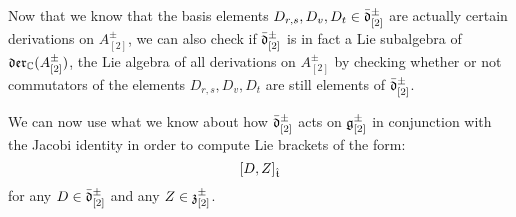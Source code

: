 \begin{remark}
                Now that we know that the basis elements $D_{r, s}, D_v, D_t \in \bar{\mathfrak{d}}_{[2]}^{\pm}$ are actually certain derivations on $A_{[2]}^{\pm}$, we can also check if $\bar{\mathfrak{d}}_{[2]}^{\pm}$ is in fact a Lie subalgebra of $\mathfrak{der}_{\mathbb{C}}(A_{[2]}^{\pm})$, the Lie algebra of all derivations on $A_{[2]}^{\pm}$ by checking whether or not commutators of the elements $D_{r, s}, D_v, D_t$ are still elements of $\bar{\mathfrak{d}}_{[2]}^{\pm}$.
            \end{remark}

            \begin{remark} \label{remark: derivation_action_on_toroidal_centres}
                We can now use what we know about how $\bar{\mathfrak{d}}_{[2]}^{\pm}$ acts on $\mathfrak{g}_{[2]}^{\pm}$ in conjunction with the Jacobi identity in order to compute Lie brackets of the form:
                    $$[D, Z]_{\hat{\mathfrak{t}}}$$
                for any $D \in \bar{\mathfrak{d}}_{[2]}^{\pm}$ and any $Z \in \mathfrak{z}_{[2]}^{\pm}$.


\end{remark}
